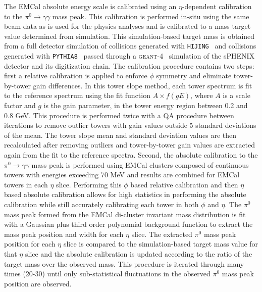 The EMCal absolute energy scale is calibrated using an $\eta$-dependent calibration to the $\pi^{0}\to\gamma\gamma$ mass peak. 
This calibration is performed in-situ using the same beam data as is used for the physics analyses and is calibrated to a mass target value determined from simulation. 
This simulation-based target mass is obtained from a full detector simulation of \auau{} collisions generated with \texttt{HIJING}~\cite{hijing} and \pp{} collisions generated with \texttt{PYTHIA8}~\cite{pythia8,pythia8_detroittune} passed through a \textsc{geant-4}~\cite{GEANT4} simulation of the sPHENIX detector and its digitization chain.
The calibration procedure contains two steps: first a relative calibration is applied to enforce $\phi$ symmetry and eliminate tower-by-tower gain differences.
In this tower slope method, each tower spectrum is fit to the reference spectrum using the fit function $A\times f(gE)$, where $A$ is a scale factor and $g$ is the gain parameter, in the tower energy region between 0.2 and 0.8 GeV.
This procedure is performed twice with a QA procedure between iterations to remove outlier towers with gain values outside 5 standard deviations of the mean. 
The tower slope mean and standard deviation values are then recalculated after removing outliers and tower-by-tower gain values are extracted again from the fit to the reference spectra.
Second, the absolute calibration to the $\pi^{0}\to\gamma\gamma$ mass peak is performed using EMCal clusters composed of continuous towers with energies exceeding 70 MeV and results are combined for EMCal towers in each $\eta$ slice. 
Performing this $\phi$ based relative calibration and then $\eta$ based absolute calibration allows for high statistics in performing the absolute calibration while still accurately calibrating each tower in both $\phi$ and $\eta$.
The $\pi^{0}$ mass peak formed from the EMCal di-cluster invariant mass distribution is fit with a Gaussian plus third order polynomial background function to extract the mass peak position and width for each $\eta$ slice.
The extracted $\pi^{0}$ mass peak position for each $\eta$ slice is compared to the simulation-based target mass value for that $\eta$ slice and the absolute calibration is updated according to the ratio of the target mass over the observed mass.
This procedure is iterated through many times (20-30) until only sub-statistical fluctuations in the observed $\pi^{0}$ mass peak position are observed.

